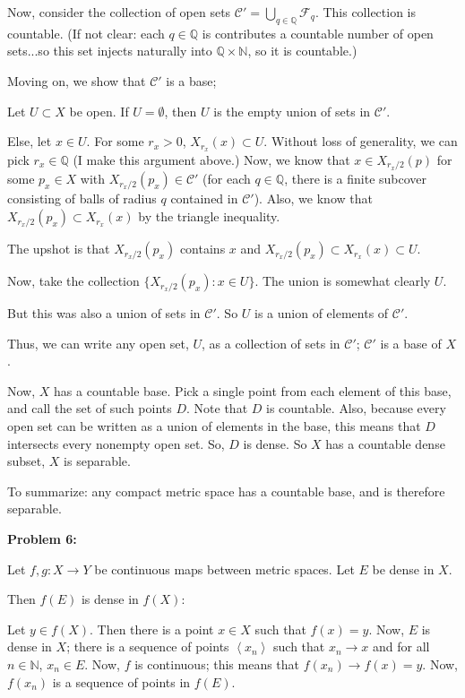 \documentclass[a4paper,12pt]{article}
\newcommand{\tab}{\hspace{4mm}} %
\newcommand{\shunt}{\vspace{20mm}}
\newcommand{\anbrack}[1]{\left\langle #1 \right\rangle}
\newcommand{\N}{\mathbb{N}}
\newcommand{\Q}{\mathbb{Q}}
\newcommand{\scrC}{\mathcal{C}}
\newcommand{\scrF}{\mathcal{F}}
\begin{document}
Now, consider the collection of open sets $\scrC' = \bigcup\limits_{q \in \Q} \scrF_q$. This collection is countable. (If not clear: each $q \in \Q$ is contributes a countable number of open sets...so this set injects naturally into $\Q \times \N$, so it is countable.)

Moving on, we show that $\scrC'$ is a base;

\tab Let $U \subset X$ be open. If $U = \emptyset$, then $U$ is the empty union of sets in $\scrC'$.

\tab Else, let $x \in U$. For some $r_x>0$, $X_{r_x}(x) \subset U$. Without loss of generality, we can pick $r_x \in \Q$ (I make this argument above.) Now, we know that $x \in X_{r_x/2}(p)$ for some $p_x \in X$ with $X_{r_x/2}(p_x) \in \scrC'$ (for each $q \in \Q$, there is a finite subcover consisting of balls of radius $q$ contained in $\scrC'$). Also, we know that $X_{r_x/2}(p_x) \subset X_{r_x}(x)$ by the triangle inequality.

\tab The upshot is that $X_{r_x/2}(p_x)$ contains $x$ and $X_{r_x/2}(p_x) \subset X_{r_x}(x) \subset U$.

\tab Now, take the collection $\{X_{r_x/2}(p_x): x \in U\}$. The union is somewhat clearly $U$. 

\tab But this was also a union of sets in $\scrC'$. So $U$ is a union of elements of $\scrC'$.

\tab Thus, we can write any open set, $U$, as a collection of sets in $\scrC'$; $\scrC'$ is a base of $X$.

Now, $X$ has a countable base. Pick a single point from each element of this base, and call the set of such points $D$. Note that $D$ is countable. Also, because every open set can be written as a union of elements in the base, this means that $D$ intersects every nonempty open set. So, $D$ is dense. So $X$ has a countable dense subset, $X$ is separable. 

To summarize: any compact metric space has a countable base, and is therefore separable.

\shunt

{\bf Problem 6:}

Let $f, g: X \to Y$ be continuous maps between metric spaces. Let $E$ be dense in $X$.

Then $f(E)$ is dense in $f(X)$:

\tab Let $y \in f(X)$. Then there is a point $x \in X$ such that $f(x) = y$. Now, $E$ is dense in $X$; there is a sequence of points $\anbrack{x_n}$ such that $x_n \to x$ and for all $n \in \N$, $x_n \in E$. Now, $f$ is continuous; this means that $f(x_n) \to f(x)=y$. Now, $f(x_n)$ is a sequence of points in $f(E)$.
\end{document}
